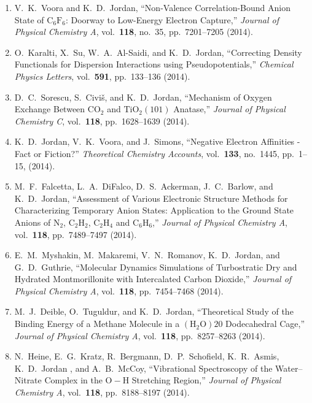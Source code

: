 \begin{enumerate}
\item V.\ K.\ Voora and K.\ D.\ Jordan, ``Non-Valence Correlation-Bound Anion State of $\mathrm{C}_6\mathrm{F}_6$: Doorway to Low-Energy Electron Capture,'' \textit{Journal of Physical Chemistry A}, vol.\ \textbf{118}, no.\ 35, pp.\ 7201--7205 (2014).

\item O.\ Karalti, X.\ Su, W.\ A.\ Al-Saidi, and K.\ D.\ Jordan, ``Correcting Density Functionals for Dispersion Interactions using Pseudopotentials,'' \textit{Chemical Physics Letters}, vol.\ \textbf{591}, pp.\ 133--136 (2014).

\item D.\ C.\ Sorescu, S.\ Civi\v{s}, and K.\ D.\ Jordan, ``Mechanism of Oxygen Exchange Between $\mathrm{CO}_2$ and $\mathrm{Ti}\mathrm{O}_2(101)$ Anatase,'' \textit{Journal of Physical Chemistry C}, vol.\ \textbf{118}, pp.\ 1628--1639 (2014).

\item K.\ D.\ Jordan, V.\ K.\ Voora, and J.\ Simons, ``Negative Electron Affinities - Fact or Fiction?'' \textit{Theoretical Chemistry Accounts}, vol.\ \textbf{133}, no.\ 1445, pp.\ 1--15, (2014).

\item M.\ F.\ Falcetta, L.\ A.\ DiFalco, D.\ S.\ Ackerman, J.\ C.\ Barlow, and K.\ D.\ Jordan, ``Assessment of Various Electronic Structure Methods for Characterizing Temporary Anion States: Application to the Ground State Anions of $\mathrm{N}_2$, $\mathrm{C}_2\mathrm{H}_2$, $\mathrm{C}_2\mathrm{H}_4$ and $\mathrm{C}_6\mathrm{H}_6$,'' \textit{Journal of Physical Chemistry A}, vol.\ \textbf{118}, pp.\ 7489--7497 (2014).

\item E.\ M.\ Myshakin, M.\ Makaremi, V.\ N.\ Romanov, K.\ D.\ Jordan, and G.\ D.\ Guthrie, ``Molecular Dynamics Simulations of Turbostratic Dry and Hydrated Montmorillonite with Intercalated Carbon Dioxide,'' \textit{Journal of Physical Chemistry A}, vol.\ \textbf{118}, pp.\ 7454--7468 (2014).

\item M.\ J.\ Deible, O.\ Tuguldur, and K.\ D.\ Jordan, ``Theoretical Study of the Binding Energy of a Methane Molecule in a $(\mathrm{H}_2\mathrm{O})20$ Dodecahedral Cage,'' \textit{Journal of Physical Chemistry A}, vol.\ \textbf{118}, pp.\ 8257--8263 (2014).

\item N.\ Heine, E.\ G.\ Kratz, R.\ Bergmann, D.\ P.\ Schofield, K.\ R.\ Asmis, K.\ D.\ Jordan , and A.\ B.\ McCoy, ``Vibrational Spectroscopy of the Water–Nitrate Complex in the $\mathrm{O}-\mathrm{H}$ Stretching Region,'' \textit{Journal of Physical Chemistry A}, vol.\ \textbf{118}, pp.\ 8188--8197 (2014).


\end{enumerate}
